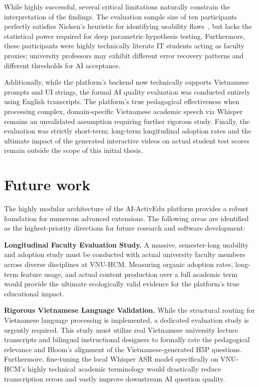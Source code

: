 While highly successful, several critical limitations naturally constrain the interpretation of the findings. The evaluation sample size of ten participants perfectly satisfies Nielsen's heuristic for identifying usability flaws~\cite{nielsen1994}, but lacks the statistical power required for deep parametric hypothesis testing. Furthermore, these participants were highly technically literate IT students acting as faculty proxies; university professors may exhibit different error recovery patterns and different thresholds for AI acceptance.

Additionally, while the platform's backend now technically supports Vietnamese prompts and UI strings, the formal AI quality evaluation was conducted entirely using English transcripts. The platform's true pedagogical effectiveness when processing complex, domain-specific Vietnamese academic speech via Whisper remains an unvalidated assumption requiring further rigorous study. Finally, the evaluation was strictly short-term; long-term longitudinal adoption rates and the ultimate impact of the generated interactive videos on actual student test scores remain outside the scope of this initial thesis.

\section{Future work}

The highly modular architecture of the AI-ActivEdu platform provides a robust foundation for numerous advanced extensions. The following areas are identified as the highest-priority directions for future research and software development:

\textbf{Longitudinal Faculty Evaluation Study.} A massive, semester-long usability and adoption study must be conducted with actual university faculty members across diverse disciplines at VNU-HCM. Measuring organic adoption rates, long-term feature usage, and actual content production over a full academic term would provide the ultimate ecologically valid evidence for the platform's true educational impact.

\textbf{Rigorous Vietnamese Language Validation.} While the structural routing for Vietnamese language processing is implemented, a dedicated evaluation study is urgently required. This study must utilize real Vietnamese university lecture transcripts and bilingual instructional designers to formally rate the pedagogical relevance and Bloom's alignment of the Vietnamese-generated H5P questions. Furthermore, fine-tuning the local Whisper ASR model specifically on VNU-HCM's highly technical academic terminology would drastically reduce transcription errors and vastly improve downstream AI question quality.

